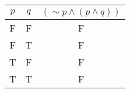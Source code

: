 \begin{tabular}{|c|c||c|}
\hline
$ p $ & $ q $ & $ ( \sim p \wedge (p \wedge q)) $ \\
\hline
F & F & F \\
F & T & F \\
T & F & F \\
T & T & F \\
\hline
\end{tabular}
\label{table:tt1}
